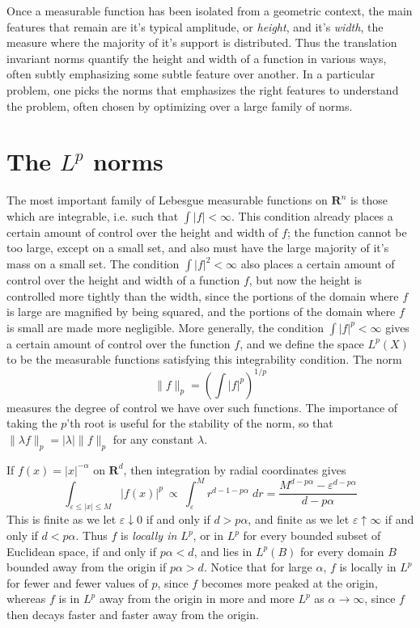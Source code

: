 Once a measurable function has been isolated from a geometric context, the main features that remain are it's typical amplitude, or {\it height}, and it's {\it width}, the measure where the majority of it's support is distributed. Thus the translation invariant norms quantify the height and width of a function in various ways, often subtly emphasizing some subtle feature over another. In a particular problem, one picks the norms that emphasizes the right features to understand the problem, often chosen by optimizing over a large family of norms.

\section{The $L^p$ norms}

The most important family of Lebesgue measurable functions on $\mathbf{R}^n$ is those which are integrable, i.e. such that $\int |f| < \infty$. This condition already places a certain amount of control over the height and width of $f$; the function cannot be too large, except on a small set, and also must have the large majority of it's mass on a small set. The condition $\int |f|^2 < \infty$ also places a certain amount of control over the height and width of a function $f$, but now the height is controlled more tightly than the width, since the portions of the domain where $f$ is large are magnified by being squared, and the portions of the domain where $f$ is small are made more negligible. More generally, the condition $\int |f|^p < \infty$ gives a certain amount of control over the function $f$, and we define the space $L^p(X)$ to be the measurable functions satisfying this integrability condition. The norm
%
\[ \| f \|_p = \left( \int |f|^p \right)^{1/p} \]
%
measures the degree of control we have over such functions. The importance of taking the $p$'th root is useful for the stability of the norm, so that $\| \lambda f \|_p = |\lambda| \| f \|_p$ for any constant $\lambda$.

\begin{example}
  If $f(x) = |x|^{-\alpha}$ on $\mathbf{R}^d$, then integration by radial coordinates gives
  \[ \int_{\varepsilon \leq |x| \leq M} |f(x)|^p\ \propto\ \int_\varepsilon^M r^{d-1 - p\alpha}\; dr = \frac{M^{d - p \alpha} - \varepsilon^{d - p \alpha}}{d - p \alpha} \]
  This is finite as we let $\varepsilon \downarrow 0$ if and only if $d > p \alpha$, and finite as we let $\varepsilon \uparrow \infty$ if and only if $d < p \alpha$. Thus $f$ is {\it locally in $L^p$}, or in $L^p$ for every bounded subset of Euclidean space, if and only if $p \alpha < d$, and lies in $L^p(B)$ for every domain $B$ bounded away from the origin if $p \alpha > d$. Notice that for large $\alpha$, $f$ is locally in $L^p$ for fewer and fewer values of $p$, since $f$ becomes more peaked at the origin, whereas $f$ is in $L^p$ away from the origin in more and more $L^p$ as $\alpha \to \infty$, since $f$ then decays faster and faster away from the origin.
\end{example}


